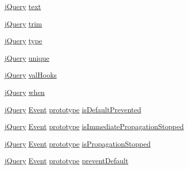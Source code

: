 \begin{DoxyCompactItemize}
\item 
\hyperlink{jquery-1_810_82_8js_a5e01048fbd3a30b44e8d491d8945c457}{j\-Query} \hyperlink{jquery-1_810_82-vsdoc_8js_aa5b77da29631a344064bb3d20c8702de}{text}
\item 
\hyperlink{jquery-1_810_82_8js_a5e01048fbd3a30b44e8d491d8945c457}{j\-Query} \hyperlink{jquery-1_810_82-vsdoc_8js_a5c6bdf61ecee84c4d51137801d3fac85}{trim}
\item 
\hyperlink{jquery-1_810_82_8js_a5e01048fbd3a30b44e8d491d8945c457}{j\-Query} \hyperlink{jquery-1_810_82-vsdoc_8js_a3940565e83a9bfd10d95ffd27536da91}{type}
\item 
\hyperlink{jquery-1_810_82_8js_a5e01048fbd3a30b44e8d491d8945c457}{j\-Query} \hyperlink{jquery-1_810_82-vsdoc_8js_a55d5adf9da69a81b8295f6bedfc34f60}{unique}
\item 
\hyperlink{jquery-1_810_82_8js_a5e01048fbd3a30b44e8d491d8945c457}{j\-Query} \hyperlink{jquery-1_810_82-vsdoc_8js_abd13691499fe1269b0042dae2caec0c1}{val\-Hooks}
\item 
\hyperlink{jquery-1_810_82_8js_a5e01048fbd3a30b44e8d491d8945c457}{j\-Query} \hyperlink{jquery-1_810_82-vsdoc_8js_ad5b56e8490e5084272548eebb74b82d6}{when}
\item 
\hyperlink{jquery-1_810_82_8js_a5e01048fbd3a30b44e8d491d8945c457}{j\-Query} \hyperlink{jquery-1_810_82-vsdoc_8js_a2cc2bb482e56b47f47b4ee54d670a418}{Event} \hyperlink{jquery-1_810_82_8js_ab5e5d0976552f788d31448ed049ae4a4}{prototype} \hyperlink{jquery-1_810_82-vsdoc_8js_af36c584d7af0deb379b8d6e3116775cc}{is\-Default\-Prevented}
\item 
\hyperlink{jquery-1_810_82_8js_a5e01048fbd3a30b44e8d491d8945c457}{j\-Query} \hyperlink{jquery-1_810_82-vsdoc_8js_a2cc2bb482e56b47f47b4ee54d670a418}{Event} \hyperlink{jquery-1_810_82_8js_ab5e5d0976552f788d31448ed049ae4a4}{prototype} \hyperlink{jquery-1_810_82-vsdoc_8js_a5fe8157d3a55c7b444e8d97b9dcde6a8}{is\-Immediate\-Propagation\-Stopped}
\item 
\hyperlink{jquery-1_810_82_8js_a5e01048fbd3a30b44e8d491d8945c457}{j\-Query} \hyperlink{jquery-1_810_82-vsdoc_8js_a2cc2bb482e56b47f47b4ee54d670a418}{Event} \hyperlink{jquery-1_810_82_8js_ab5e5d0976552f788d31448ed049ae4a4}{prototype} \hyperlink{jquery-1_810_82-vsdoc_8js_a67f2430529d27bb55dbfa279dc2899ea}{is\-Propagation\-Stopped}
\item 
\hyperlink{jquery-1_810_82_8js_a5e01048fbd3a30b44e8d491d8945c457}{j\-Query} \hyperlink{jquery-1_810_82-vsdoc_8js_a2cc2bb482e56b47f47b4ee54d670a418}{Event} \hyperlink{jquery-1_810_82_8js_ab5e5d0976552f788d31448ed049ae4a4}{prototype} \hyperlink{jquery-1_810_82-vsdoc_8js_aafc4d39414b638f56c88573e5f8b4fb4}{prevent\-Default}

\end{DoxyCompactItemize}
